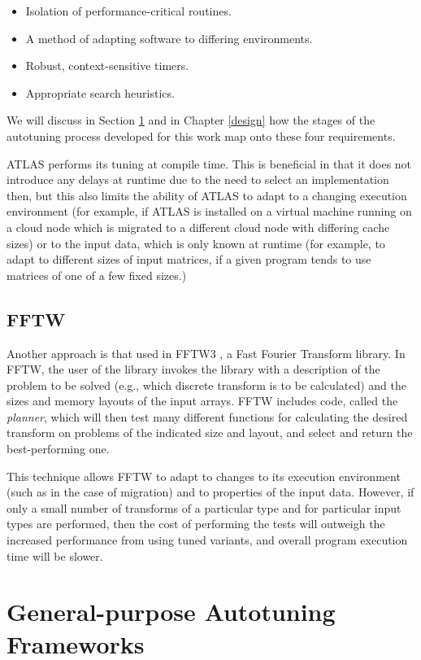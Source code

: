 \documentclass[msthesis,justified,copyright,final,numbers,sort&compress,
gsmodern,amstex,natbib]{uothesis}
\begin{document}
\begin{itemize}
\item Isolation of performance-critical routines.
\item A method of adapting software to differing environments.
\item Robust, context-sensitive timers.
\item Appropriate search heuristics.
\end{itemize}

We will discuss in Section \ref{general} and in Chapter \ref{design} how the stages of the autotuning process developed for this work map onto these four requirements.

ATLAS performs its tuning at compile time. This is beneficial in that it does not introduce any delays at runtime due to the need to select an implementation then, but this also limits the ability of ATLAS to adapt to a changing execution environment (for example, if ATLAS is installed on a virtual machine running on a cloud node which is migrated to a different cloud node with differing cache sizes) or to the input data, which is only known at runtime (for example, to adapt to different sizes of input matrices, if a given program tends to use matrices of one of a few fixed sizes.)

\subsection{FFTW}

Another approach is that used in FFTW3 \cite{fftw}, a Fast Fourier Transform library. In FFTW, the user of the library invokes the library with a description of the problem to be solved (e.g., which discrete transform is to be calculated) and the sizes and memory layouts of the input arrays. FFTW includes code, called the \emph{planner}, which will then test many different functions for calculating the desired transform on problems of the indicated size and layout, and select and return the best-performing one.

This technique allows FFTW to adapt to changes to its execution environment (such as in the case of migration) and to properties of the input data. However, if only a small number of transforms of a particular type and for particular input types are performed, then the cost of performing the tests will outweigh the increased performance from using tuned variants, and overall program execution time will be slower.

\section{General-purpose Autotuning Frameworks}
\label{general}
\end{document}
